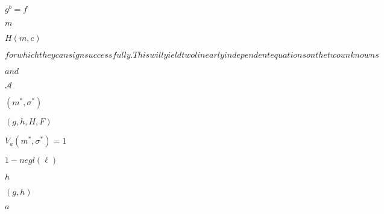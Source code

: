 \documentclass[10pt]{book}
\begin{document}
\begin{mdSnippets}
\begin{mdInlineSnippet}[9bd123eb16910b3ff1ebfeb5ec54ea47]%
$g^b=f$\end{mdInlineSnippet}%
\begin{mdInlineSnippet}[6f8f57715090da2632453988d9a1501b]%
$m$\end{mdInlineSnippet}%
\begin{mdInlineSnippet}[b30d983384207908528512508f78d805]%
$H(m,c)$\end{mdInlineSnippet}%
\begin{mdInlineSnippet}%
$ for which they can sign successfully. This will yield two linearly independent equations on the two unknowns $\end{mdInlineSnippet}%
\begin{mdInlineSnippet}[0060636b449d1da5a8581bfee180f0c2]%
$ and $\end{mdInlineSnippet}%
\begin{mdInlineSnippet}[ad70146b431bea9ae74cf8385470c544]%
$\mathcal{A}$\end{mdInlineSnippet}%
\begin{mdInlineSnippet}[1008ab34a764ff91daf540437a7c7c18]%
$(m^*, \sigma^*)$\end{mdInlineSnippet}%
\begin{mdInlineSnippet}[6746c917f6f4949aa96c84a69f85c240]%
$(g,h,H,F)$\end{mdInlineSnippet}%
\begin{mdInlineSnippet}[26314081991ce61b7700b70839ba40e5]%
$V_a(m^*,\sigma^*) = 1$\end{mdInlineSnippet}%
\begin{mdInlineSnippet}[931d8f167d0fbe68e97e315609031fb3]%
$1 - negl(\ell)$\end{mdInlineSnippet}%
\begin{mdInlineSnippet}[2510c39011c5be704182423e3a695e91]%
$h$\end{mdInlineSnippet}%
\begin{mdInlineSnippet}[90e8f35ea87a853a71f3ddbe82f8105f]%
$(g,h)$\end{mdInlineSnippet}%
\begin{mdInlineSnippet}[0cc175b9c0f1b6a831c399e269772661]%
$a$\end{mdInlineSnippet}%

\end{mdSnippets}
\end{document}
